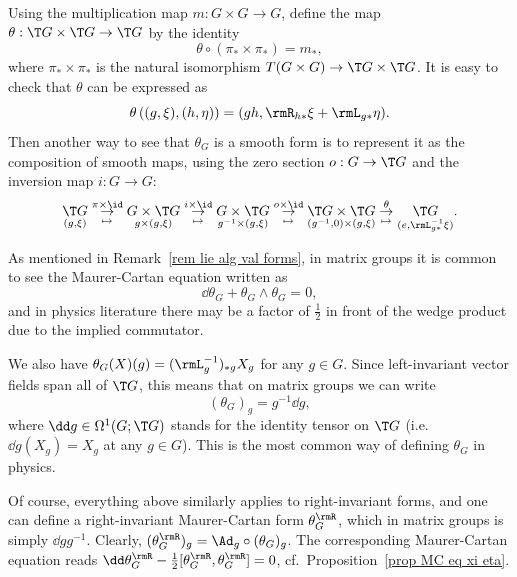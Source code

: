 \begin{rem}
    Using the multiplication map $m:G\times G\to G$, define the map $\theta:\T G\times \T G\to \T G$ by the identity
    \[\theta\circ (\pi_\ast\times \pi_\ast)=m_\ast,\]
    where $\pi_\ast\times \pi_\ast$ is the natural isomorphism $T(G\times G)\to \T G\times \T G$. It is easy to check that $\theta$ can be expressed as
    \[\theta\left((g,\xi),(h,\eta)\right)=(gh,\rmR_{h\ast}\xi+\rmL_{g\ast}\eta).\label{eq m_ast}\]
    Then another way to see that $\theta_G$ is a smooth form is to represent it as the composition of smooth maps, using the zero section $o:G\to \T G$ and the inversion map $i:G\to G$:
    \[\underset{(g,\xi)}{\T G}
    \underset{\mapsto}{\overset{\pi\times\id}{\to}}
    \underset{g\times (g,\xi)}{G\times \T G}
    \underset{\mapsto}{\overset{i\times\id}{\to}}
    \underset{g^{-1}\times (g,\xi)}{G\times \T G}
    \underset{\mapsto}{\overset{o\times\id}{\to}}
    \underset{(g^{-1},0)\times (g,\xi)}{\T G\times \T G}
    \underset{\mapsto}{\overset{\theta}{\to}}
    \underset{(e,\rmL_{g\ast}^{-1}\xi)}{\T G}.\label{eq MC form as composition}
    \]
\end{rem}


\begin{rem}
    As mentioned in Remark~\ref{rem lie alg val forms}, in matrix groups it is common to see the Maurer-Cartan equation written as 
    \[\dd\theta_G +\theta_G\wedge\theta_G=0,\]
    and in physics literature there may be a factor of $\frac12$ in front of the wedge product due to the implied commutator.

    We also have $\theta_G(X)(g)=(\rmL_{g}^{-1})_{\ast g}X_g$ for any $g\in G$. Since left-invariant vector fields span all of $\T G$, this means that on matrix groups we can write 
    \[(\theta_G)_g=g^{-1}\dd g,\]
    where $\dd g\in \Omega^1(G;\T G)$ stands for the identity tensor on $\T G$ (i.e.~$\dd g(X_g)=X_g$ at any $g\in G$). This is the most common way of defining $\theta_G$ in physics.
\end{rem}

\begin{rem}\label{rem right MC eq}
    Of course, everything above similarly applies to right-invariant forms, and one can define a right-invariant Maurer-Cartan form $\theta_G^\rmR$, which in matrix groups is simply $\dd g g^{-1}$. Clearly, $(\theta_G^\rmR)_g=\Ad_g\circ(\theta_G)_g$. The corresponding Maurer-Cartan equation reads $\dd\theta_G^\rmR-\frac12[\theta_G^\rmR,\theta_G^\rmR]=0$, cf.\ Proposition~\ref{prop MC eq xi eta}.
\end{rem}

